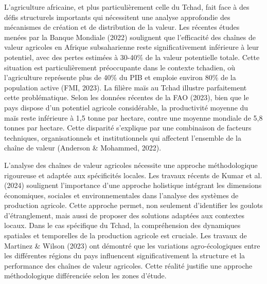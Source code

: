 \documentclass[12pt,oneside]{report}
\begin{document}
L'agriculture africaine, et plus particulièrement celle du Tchad, fait face à des défis structurels importants qui nécessitent une analyse approfondie des mécanismes de création et de distribution de la valeur. Les récentes études menées par la Banque Mondiale (2022) soulignent que l'efficacité des chaînes de valeur agricoles en Afrique subsaharienne reste significativement inférieure à leur potentiel, avec des pertes estimées à 30-40\% de la valeur potentielle totale. Cette situation est particulièrement préoccupante dans le contexte tchadien, où l'agriculture représente plus de 40\% du PIB et emploie environ 80\% de la population active (FMI, 2023). La filière maïs au Tchad illustre parfaitement cette problématique. Selon les données récentes de la FAO (2023), bien que le pays dispose d'un potentiel agricole considérable, la productivité moyenne du maïs reste inférieure à 1,5 tonne par hectare, contre une moyenne mondiale de 5,8 tonnes par hectare. Cette disparité s'explique par une combinaison de facteurs techniques, organisationnels et institutionnels qui affectent l'ensemble de la chaîne de valeur (Anderson \& Mohammed, 2022).

L'analyse des chaînes de valeur agricoles nécessite une approche méthodologique rigoureuse et adaptée aux spécificités locales. Les travaux récents de Kumar et al. (2024) soulignent l'importance d'une approche holistique intégrant les dimensions économiques, sociales et environnementales dans l'analyse des systèmes de production agricole. Cette approche permet, non seulement d'identifier les goulots d'étranglement, mais aussi de proposer des solutions adaptées aux contextes locaux. Dans le cas spécifique du Tchad, la compréhension des dynamiques spatiales et temporelles de la production agricole est cruciale. Les travaux de Martinez \& Wilson (2023) ont démontré que les variations agro-écologiques entre les différentes régions du pays influencent significativement la structure et la performance des chaînes de valeur agricoles. Cette réalité justifie une approche méthodologique différenciée selon les zones d'étude.
\end{document}

